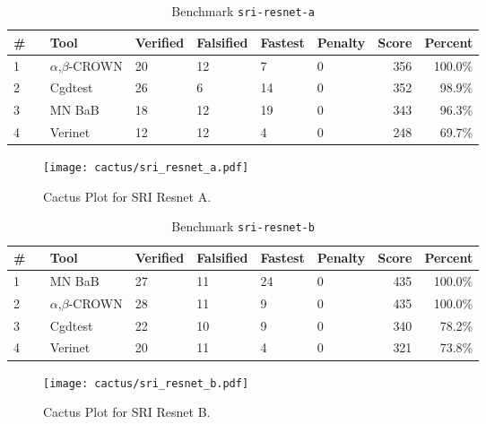 \begin{table}[h]
\begin{center}
\caption{Benchmark \texttt{sri-resnet-a}} \label{tab:cat_{cat}}
{\setlength{\tabcolsep}{2pt}
\begin{tabular}[h]{@{}llllllrr@{}}
\toprule
\textbf{\# ~} & \textbf{Tool} & \textbf{Verified} & \textbf{Falsified} & \textbf{Fastest} & \textbf{Penalty} & \textbf{Score} & \textbf{Percent}\\
\midrule
1 & $\alpha$,$\beta$-CROWN & 20 & 12 & 7 & 0 & 356 & 100.0\% \\
2 & Cgdtest & 26 & 6 & 14 & 0 & 352 & 98.9\% \\
3 & MN BaB & 18 & 12 & 19 & 0 & 343 & 96.3\% \\
4 & Verinet & 12 & 12 & 4 & 0 & 248 & 69.7\% \\
\bottomrule
\end{tabular}
}
\end{center}
\end{table}



\begin{figure}[h]
\centerline{\texttt{[image: cactus/sri\_resnet\_a.pdf]}}
\caption{Cactus Plot for SRI Resnet A.}
\label{fig:quantPic}
\end{figure}



\begin{table}[h]
\begin{center}
\caption{Benchmark \texttt{sri-resnet-b}} \label{tab:cat_{cat}}
{\setlength{\tabcolsep}{2pt}
\begin{tabular}[h]{@{}llllllrr@{}}
\toprule
\textbf{\# ~} & \textbf{Tool} & \textbf{Verified} & \textbf{Falsified} & \textbf{Fastest} & \textbf{Penalty} & \textbf{Score} & \textbf{Percent}\\
\midrule
1 & MN BaB & 27 & 11 & 24 & 0 & 435 & 100.0\% \\
2 & $\alpha$,$\beta$-CROWN & 28 & 11 & 9 & 0 & 435 & 100.0\% \\
3 & Cgdtest & 22 & 10 & 9 & 0 & 340 & 78.2\% \\
4 & Verinet & 20 & 11 & 4 & 0 & 321 & 73.8\% \\
\bottomrule
\end{tabular}
}
\end{center}
\end{table}



\begin{figure}[h]
\centerline{\texttt{[image: cactus/sri\_resnet\_b.pdf]}}
\caption{Cactus Plot for SRI Resnet B.}
\label{fig:quantPic}
\end{figure}


